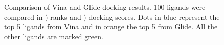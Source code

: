 \documentclass[11pt, letterpaper, titlepage]{article}
\begin{document}
\begin{figure}[htp]
	\centering
	\captionsetup[subfigure]{skip=-20pt,position=top,labelfont=bf,labelformat=parens,singlelinecheck=false}
	\caption{Comparison of Vina and Glide docking results. 100 ligands were compared in  ) ranks and ) docking scores. Dots in blue represent the top 5 ligands from Vina and in orange the top 5 from Glide. All the other ligands are marked green.}\label{fig:comp_glide_vina}
\end{figure}
\end{document}
